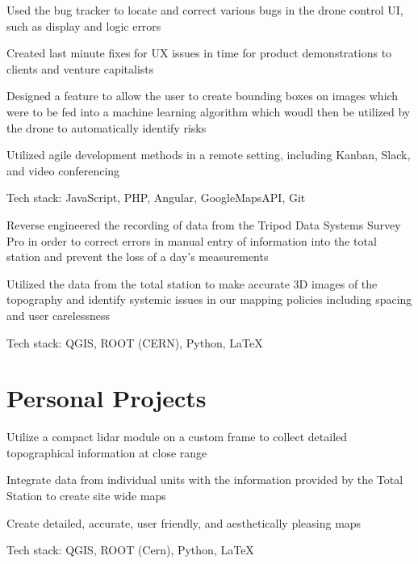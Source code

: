 \documentclass[letterpaper]{resume}
\begin{document}
\begin{compactitem}
\item Used the bug tracker to locate and correct various bugs in the drone control UI, such as display and logic errors
\item Created last minute fixes for UX issues in time for product demonstrations to clients and venture capitalists
\item Designed a feature to allow the user to create bounding boxes on images which were to be fed into a machine learning algorithm which woudl then be utilized by the drone to automatically identify risks
\item Utilized agile development methods in a remote setting, including Kanban, Slack, and video conferencing
\item Tech stack: JavaScript, PHP, Angular, GoogleMapsAPI, Git
\end{compactitem}

\begin{compactitem}
\item Reverse engineered the recording of data from the Tripod Data Systems Survey Pro in order to correct errors in manual entry of information into the total station and prevent the loss of a day's measurements
\item Utilized the data from the total station to make accurate 3D images of the topography and identify systemic issues in our mapping policies including spacing and user carelessness
\item Tech stack: QGIS, ROOT (CERN), Python, LaTeX
\end{compactitem}

\section{Personal Projects}

\begin{compactitem}
\item Utilize a compact lidar module on a custom frame to collect detailed topographical information at close range
\item Integrate data from individual units with the information provided by the Total Station to create site wide maps
\item Create detailed, accurate, user friendly, and aesthetically pleasing maps
\item Tech stack: QGIS, ROOT (Cern), Python, LaTeX
\end{compactitem}
\end{document}
